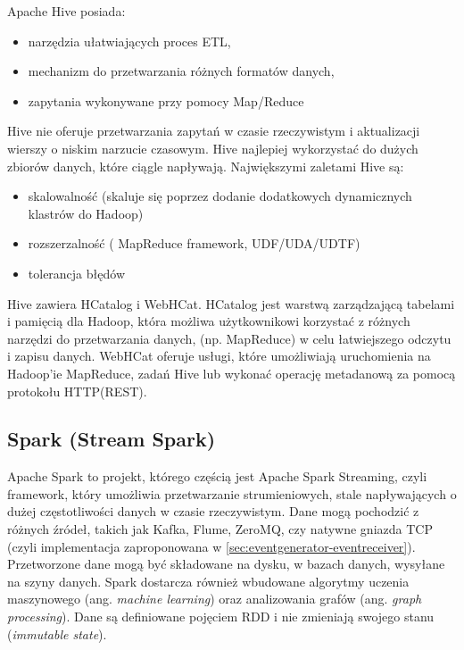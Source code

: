 Apache Hive posiada:

\begin{itemize}[noitemsep]
\item narzędzia ułatwiających proces ETL,
\item mechanizm do przetwarzania różnych formatów danych,
\item zapytania wykonywane przy pomocy Map/Reduce
\end{itemize}

Hive nie oferuje przetwarzania zapytań w czasie rzeczywistym i aktualizacji wierszy o niskim narzucie czasowym. Hive najlepiej wykorzystać do dużych zbiorów danych, które ciągle napływają. Największymi zaletami Hive są:

\begin{itemize}[noitemsep]
\item skalowalność (skaluje się poprzez dodanie dodatkowych dynamicznych klastrów do Hadoop)
\item rozszerzalność ( MapReduce framework, UDF/UDA/UDTF)
\item tolerancja błędów
\end{itemize}

Hive zawiera HCatalog i WebHCat. HCatalog jest warstwą zarządzającą tabelami i pamięcią dla Hadoop, która możliwa użytkownikowi korzystać z różnych narzędzi do przetwarzania danych, (np. MapReduce) w celu łatwiejszego odczytu i zapisu danych. WebHCat oferuje usługi, które umożliwiają uruchomienia na Hadoop'ie MapReduce, zadań Hive lub wykonać operację metadanową za pomocą protokołu HTTP(REST).

\subsection{Spark (Stream Spark)}
\label{sec:solutions:spark}

Apache Spark to projekt, którego częścią jest Apache Spark Streaming, czyli framework, który umożliwia przetwarzanie strumieniowych, stale napływających o dużej częstotliwości danych w czasie rzeczywistym. Dane mogą pochodzić z różnych źródeł, takich jak Kafka, Flume, ZeroMQ, czy natywne gniazda TCP (czyli implementacja zaproponowana w \ref{sec:eventgenerator-eventreceiver}). Przetworzone dane mogą być składowane na dysku, w bazach danych, wysyłane na szyny danych. Spark dostarcza również wbudowane algorytmy uczenia maszynowego (ang. \emph{machine learning}) oraz analizowania grafów (ang. \emph{graph processing}). Dane są definiowane pojęciem RDD\cite{manual-apache-spark-streaming} i nie zmieniają swojego stanu (\emph{immutable state}).

